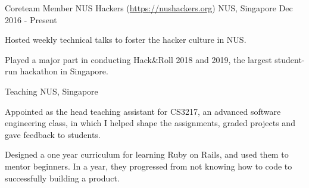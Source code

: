 

\begin{cventries}


  \cventry
  {Coreteam Member} %
  {NUS Hackers (\url{https://nushackers.org})} %
  {NUS, Singapore} %
  {Dec 2016 - Present} %
  { %
    \begin{cvitems}
    \item {Hosted weekly technical talks to foster the hacker culture in NUS.}
    \item {Played a major part in conducting Hack\&Roll 2018 and 2019, the largest student-run hackathon in Singapore.}
    \end{cvitems}
  }


  \cventry
  {} %
  {Teaching} %
  {NUS, Singapore} %
  {} %
  { %
    \begin{cvitems}
    \item {Appointed as the head teaching assistant for CS3217, an advanced software engineering class, in which I helped shape the assignments, graded projects and gave feedback to students.}
    \item {Designed a one year curriculum for learning Ruby on Rails, and used them to mentor beginners. In a year, they progressed from not knowing how to code to successfully building a product.}
    \end{cvitems}
  }

\end{cventries}

